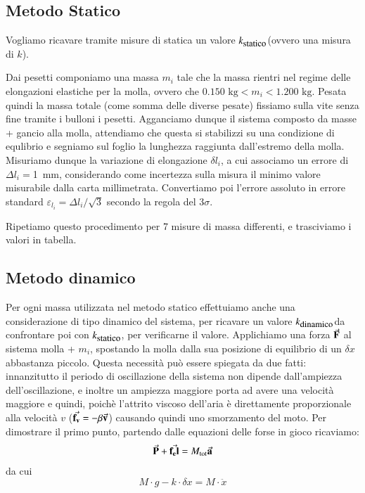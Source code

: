 \documentclass[italian, a4paper, 10pt, twocolumn]{../../style/lab_unige}
\newcommand{\ks}{$k_{\text{\small statico}}$\space}
\newcommand{\kd}{$k_{\text{\small dinamico}}$\space}
\newcommand{\treSigma}{$3\sigma$\space}
\newcommand{\MassI}[1]{$m_{#1}$}
\begin{document}
    \subsection{Metodo Statico}
    \label{subsec:methods_stat}
    Vogliamo ricavare tramite misure di statica un valore \ks (ovvero una misura di $k$).

    Dai pesetti componiamo una massa \MassI{i} tale che la massa rientri nel regime delle elongazioni elastiche per
    la molla, ovvero che  $0.150 \text{ kg} < m_i < 1.200 \text{ kg}$. 
    Pesata quindi la massa totale (come somma delle diverse pesate) fissiamo sulla vite senza fine tramite i bulloni
    i pesetti. Agganciamo dunque il sistema composto da masse + gancio alla molla, attendiamo che questa si 
    stabilizzi su una condizione di equlibrio e segniamo sul foglio la lunghezza raggiunta dall'estremo della molla.
    Misuriamo dunque la variazione di elongazione $\delta l_i$, a cui associamo un errore di $\Delta l_i=$1~mm, 
    considerando come incertezza sulla misura il minimo valore misurabile dalla carta millimetrata. Convertiamo 
    poi l'errore assoluto in errore standard $\varepsilon_{l_i} = \Delta l_i /\sqrt{3}$ secondo la regola del 
    \treSigma.
    
    Ripetiamo questo procedimento per 7 misure di massa differenti, e trasciviamo i valori in tabella. %

    \subsection{Metodo dinamico}
    \label{subsec:methods_dyn}
    Per ogni massa utilizzata nel metodo statico effettuiamo anche una considerazione di tipo dinamico del sistema,
    per ricavare un valore \kd da confrontare poi con \ks, per verificarne il valore.
    Applichiamo una forza $\va{F}$ al sistema molla + \MassI{i}, spostando la molla dalla sua posizione di 
    equilibrio di un $\delta x$ abbastanza piccolo. Questa necessità può essere spiegata da due fatti: innanzitutto
    il periodo di oscillazione della sistema non dipende dall'ampiezza dell'oscillazione, e inoltre un ampiezza 
    maggiore porta ad avere una velocità maggiore e quindi, poichè l'attrito viscoso dell'aria è direttamente 
    proporzionale alla velocità $v$ ($\va{f_v}=-\beta \va{v}$) causando quindi uno smorzamento del moto. 
    Per dimostrare il primo punto, partendo dalle equazioni delle forse in gioco ricaviamo:
    \[
        \va{P} + \va{f_el} = M_{\text{tot}}\va{a}
    \]
    da cui 
    \[
        M\cdot g - k\cdot\delta x = M \cdot \ddot{x}
    \]
\end{document}
